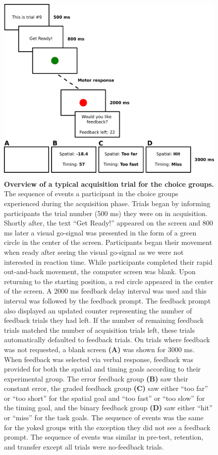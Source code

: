 \documentclass[
  doc, donotrepeattitle,floatsintext]{apa7}
\begin{document}
\begin{figure}

{\centering \includegraphics[height=0.45\textheight]{../../figs/fig1} 

}

\caption{\small \normalfont \onehalfspacing \textbf{Overview of a typical acquisition trial for the choice groups.} The sequence of events a participant in the choice groups experienced during the acquisition phase. Trials began by informing participants the trial number (500 ms) they were on in acquisition. Shortly after, the text ``Get Ready!'' appeared on the screen and 800 ms later a visual go-signal was presented in the form of a green circle in the center of the screen. Participants began their movement when ready after seeing the visual go-signal as we were not interested in reaction time. While participants completed their rapid out-and-back movement, the computer screen was blank. Upon returning to the starting position, a red circle appeared in the center of the screen. A 2000 ms feedback delay interval was used and this interval was followed by the feedback prompt. The feedback prompt also displayed an updated counter representing the number of feedback trials they had left. If the number of remaining feedback trials matched the number of acquisition trials left, these trials automatically defaulted to feedback trials. On trials where feedback was not requested, a blank screen \textbf{(A)} was shown for 3000 ms. When feedback was selected via verbal response, feedback was provided for both the spatial and timing goals according to their experimental group. The error feedback group \textbf{(B)} saw their constant error, the graded feedback group \textbf{(C)} saw either ``too far'' or ``too short'' for the spatial goal and ``too fast'' or ``too slow'' for the timing goal, and the binary feedback group \textbf{(D)} saw either ``hit'' or ``miss'' for the task goals. The sequence of events was the same for the yoked groups with the exception they did not see a feedback prompt. The sequence of events was similar in pre-test, retention, and transfer except all trials were no-feedback trials.}\label{fig:fig1}
\end{figure}
\end{document}
